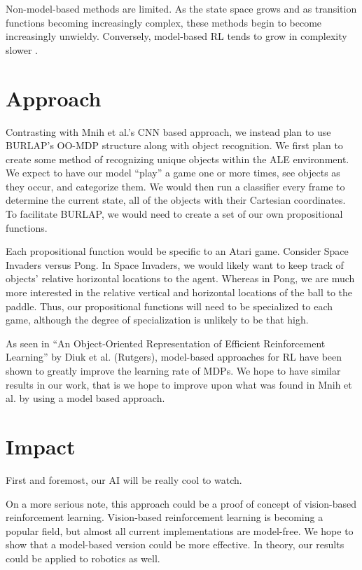 \documentclass[11pt]{article}
\begin{document}
Non-model-based methods are limited. As the state space grows and as transition functions becoming increasingly complex, these methods begin to become increasingly unwieldy. Conversely, model-based RL tends to grow in complexity slower \cite{diuk08}.

\section{Approach}
\label{S:approach}

Contrasting with Mnih et al.'s CNN based approach, we instead plan to use BURLAP's OO-MDP structure along with object recognition.  We first plan to create some method of recognizing unique objects within the ALE environment. We expect to have our model ``play'' a game one or more times, see objects as they occur, and categorize them. We would then run a classifier every frame to determine the current state, all of the objects with their Cartesian coordinates. To facilitate BURLAP, we would need to create a set of our own propositional functions.

Each propositional function would be specific to an Atari game. Consider Space Invaders versus Pong. In Space Invaders, we would likely want to keep track of objects' relative horizontal locations to the agent. Whereas in Pong, we are much more interested in the relative vertical and horizontal locations of the ball to the paddle. Thus, our propositional functions will need to be specialized to each game, although the degree of specialization is unlikely to be that high.

As seen in ``An Object-Oriented Representation of Efficient Reinforcement Learning'' by Diuk et al. (Rutgers), model-based approaches for RL have been shown to greatly improve the learning rate of MDPs. We hope to have similar results in our work, that is we hope to improve upon what was found in Mnih et al. by using a model based approach.

\section{Impact}
\label{S:impact}

First and foremost, our AI will be really cool to watch.

On a more serious note, this approach could be a proof of concept of vision-based reinforcement learning. Vision-based reinforcement learning is becoming a popular field, but almost all current implementations are model-free. We hope to show that a model-based version could be more effective. In theory, our results could be applied to robotics as well.
\end{document}
